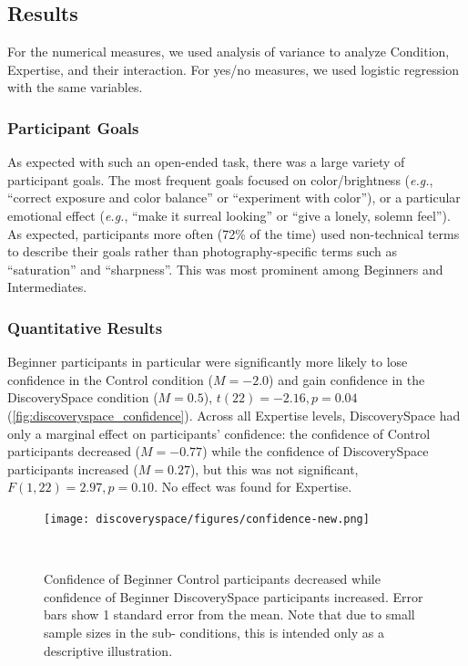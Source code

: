 \subsection{Results}
For the numerical measures, we used analysis of variance to analyze Condition, Expertise, and their interaction. For yes/no measures, we used logistic regression with the same variables. 

\subsubsection{Participant Goals}
As expected with such an open-ended task, there was a large variety of participant goals. The most frequent goals focused on color/brightness (\textit{e.g.}, ``correct exposure and color balance'' or ``experiment with color''), or a particular emotional effect (\textit{e.g.}, ``make it surreal looking'' or ``give a lonely, solemn feel''). As expected, participants more often (72\% of the time) used non-technical terms to describe their goals rather than photography-specific terms such as ``saturation'' and ``sharpness''. This was most prominent among Beginners and Intermediates.

\subsubsection{Quantitative Results}
Beginner participants in particular were significantly more likely to lose confidence in the Control condition ($M = -2.0$) and gain confidence in the Discovery\-Space condition ($M = 0.5$), $t(22) = -2.16, p = 0.04$ (\autoref{fig:discoveryspace_confidence}). Across all Expertise levels, Discovery\-Space had only a marginal effect on participants' confidence: the confidence of Control participants decreased ($M = -0.77$) while the confidence of Discovery\-Space participants increased ($M = 0.27$), but this was not significant, $F(1, 22) = 2.97, p = 0.10$. No effect was found for Expertise. 

\begin{figure}
\centering
  \texttt{[image: discoveryspace/figures/confidence-new.png]}
  \caption{Confidence of Beginner Control participants decreased while confidence of Beginner Discovery\-Space participants increased. Error bars show 1 standard error from the mean. Note that due to small sample sizes in the sub- conditions, this is intended only as a descriptive illustration.}~\label{fig:discoveryspace_confidence}
\end{figure}

